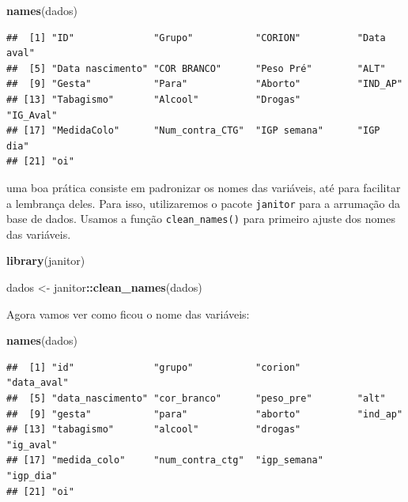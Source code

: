 \documentclass[
]{book}
\newenvironment{Shaded}{\begin{snugshade}}{\end{snugshade}}
\newcommand{\KeywordTok}[1]{\textcolor[rgb]{0.13,0.29,0.53}{\textbf{#1}}}
\newcommand{\NormalTok}[1]{#1}
\newcommand{\OperatorTok}[1]{\textcolor[rgb]{0.81,0.36,0.00}{\textbf{#1}}}
\newcommand{\StringTok}[1]{\textcolor[rgb]{0.31,0.60,0.02}{#1}}
\begin{document}
\begin{Shaded}
\begin{Highlighting}[]
\KeywordTok{names}\NormalTok{(dados)}
\end{Highlighting}
\end{Shaded}

\begin{verbatim}
##  [1] "ID"              "Grupo"           "CORION"          "Data aval"      
##  [5] "Data nascimento" "COR BRANCO"      "Peso Pré"        "ALT"            
##  [9] "Gesta"           "Para"            "Aborto"          "IND_AP"         
## [13] "Tabagismo"       "Alcool"          "Drogas"          "IG_Aval"        
## [17] "MedidaColo"      "Num_contra_CTG"  "IGP semana"      "IGP dia"        
## [21] "oi"
\end{verbatim}

uma boa prática consiste em padronizar os nomes das variáveis, até para facilitar a lembrança deles. Para isso, utilizaremos o pacote \texttt{janitor} para a arrumação da base de dados. Usamos a função \texttt{clean\_names()} para primeiro ajuste dos nomes das variáveis.

\begin{Shaded}
\begin{Highlighting}[]
\KeywordTok{library}\NormalTok{(janitor)}
\end{Highlighting}
\end{Shaded}

\begin{Shaded}
\begin{Highlighting}[]
\NormalTok{dados <-}\StringTok{ }\NormalTok{janitor}\OperatorTok{::}\KeywordTok{clean_names}\NormalTok{(dados) }
\end{Highlighting}
\end{Shaded}

Agora vamos ver como ficou o nome das variáveis:

\begin{Shaded}
\begin{Highlighting}[]
\KeywordTok{names}\NormalTok{(dados)}
\end{Highlighting}
\end{Shaded}

\begin{verbatim}
##  [1] "id"              "grupo"           "corion"          "data_aval"      
##  [5] "data_nascimento" "cor_branco"      "peso_pre"        "alt"            
##  [9] "gesta"           "para"            "aborto"          "ind_ap"         
## [13] "tabagismo"       "alcool"          "drogas"          "ig_aval"        
## [17] "medida_colo"     "num_contra_ctg"  "igp_semana"      "igp_dia"        
## [21] "oi"
\end{verbatim}
\end{document}

